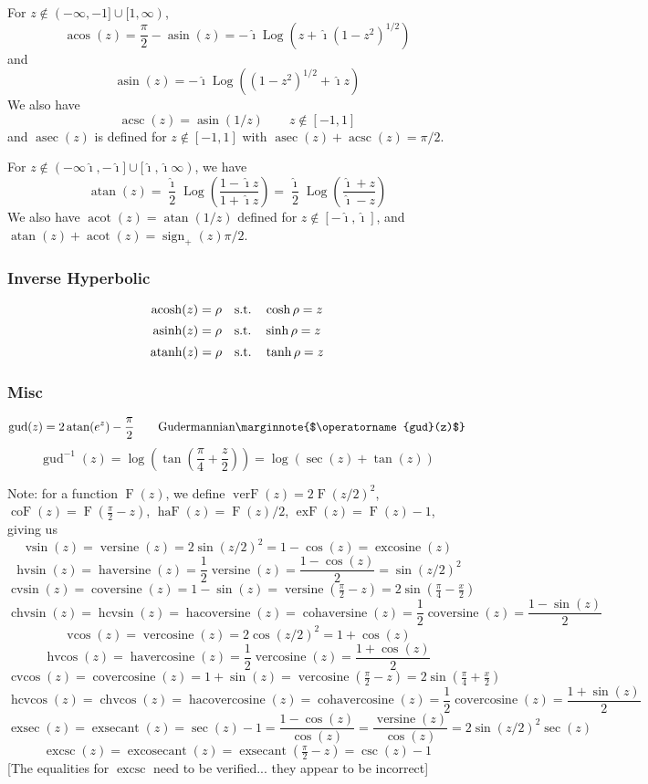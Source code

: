 \documentclass[10pt,dvipdfmx,letterpaper,twoside]{article}
\DeclareMathOperator{\acos}{acos}
\DeclareMathOperator{\asin}{asin}
\DeclareMathOperator{\atan}{atan}
\DeclareMathOperator{\acosh}{acosh}
\DeclareMathOperator{\asinh}{asinh}
\DeclareMathOperator{\atanh}{atanh}
\let\O=\operatorname
\newcommand{\ii}{{\hat{\imath}}}
\let\DEF=\marginnote
\begin{document}
For $z\notin(-\infty,-1]\cup[1,\infty)$,
\[ \acos(z) = \frac{\pi}{2} - \asin(z) = -\ii \O{Log}(z + \ii(1-z^2)^{1/2}) \]
and
\[ \asin(z) = -\ii \O{Log}((1-z^2)^{1/2} + \ii z) \]
We also have
\[ \O{acsc}(z)=\asin(1/z) \qquad z\notin[-1,1] \]
and $\O{asec}(z)$ is defined for $z\notin[-1,1]$ with $\O{asec}(z)+\O{acsc}(z)=\pi/2$.

For $z\notin(-\infty\ii,-\ii]\cup[\ii,\ii\infty)$, we have
\[ \atan(z) = \frac{\ii}{2}\O{Log}(\frac{1-\ii z}{1+\ii z}) = \frac{\ii}{2}\O{Log}(\frac{\ii+z}{\ii-z}) \]
We also have $\O{acot}(z) = \atan(1/z)$ defined for $z\notin[-\ii,\ii]$, and $\atan(z)+\O{acot}(z)=\O{sign}_+(z)\pi/2$.

\subsubsection{Inverse Hyperbolic}
\[ \acosh(z) = \rho \text{\quad s.t.\quad} \cosh\rho = z \]
\[ \asinh(z) = \rho \text{\quad s.t.\quad} \sinh\rho = z \]
\[ \atanh(z) = \rho \text{\quad s.t.\quad} \tanh\rho = z \]

\subsubsection{Misc}
\[ \O{gud}(z) = 2\atan(e^{z}) - \frac\pi2 \qquad\text{Gudermannian} \DEF{$\O{gud}(z)$}\]
\[ \O{gud}^{-1}(z) = \log(\tan(\frac{\pi}{4}+\frac{z}{2})) = \log(\sec(z) + \tan(z)) \]

Note: for a function $\O{F}(z)$, we define
$\O{verF}(z) = 2 \O{F}(z/2)^2$, 
$\O{coF}(z) = \O{F}(\tfrac{\pi}{2} - z)$, 
$\O{haF}(z) = \O{F}(z)/2$, 
$\O{exF}(z) = \O{F}(z) - 1$, giving us
\[ \O{vsin}(z) = \O{versine}(z) =  2\sin(z/2)^2 = 1 - \cos(z) = \O{excosine}(z) \]
\[ \O{hvsin}(z) = \O{haversine}(z) = \frac12\O{versine}(z) = \frac{1-\cos(z)}{2} = \sin(z/2)^2 \]
\[ \O{cvsin}(z) = \O{coversine}(z) = 1 - \sin(z) = \O{versine}(\tfrac\pi2 - z) = 2\sin(\tfrac\pi4 - \tfrac{x}{2}) \]
\[ \O{chvsin}(z) = \O{hcvsin}(z) = \O{hacoversine}(z) = \O{cohaversine}(z) = \frac12\O{coversine}(z) = \frac{1-\sin(z)}{2} \]
\[ \O{vcos}(z) = \O{vercosine}(z) =  2\cos(z/2)^2 = 1 + \cos(z) \]
\[ \O{hvcos}(z) = \O{havercosine}(z) = \frac12\O{vercosine}(z) = \frac{1+\cos(z)}{2} \]
\[ \O{cvcos}(z) = \O{covercosine}(z) = 1 + \sin(z) = \O{vercosine}(\tfrac\pi2 - z) = 2\sin(\tfrac\pi4 + \tfrac{x}{2}) \]
\[ \O{hcvcos}(z) = \O{chvcos}(z) = \O{hacovercosine}(z) = \O{cohavercosine}(z) = \frac12\O{covercosine}(z) = \frac{1+\sin(z)}{2} \]
\[ \O{exsec}(z) = \O{exsecant}(z) = \sec(z) - 1 = \frac{1-\cos(z)}{\cos(z)} = \frac{\O{versine}(z)}{\cos(z)} = 2\sin(z/2)^2\sec(z) \]
\[ \O{excsc}(z) = \O{excosecant}(z) = \O{exsecant}(\tfrac\pi2 - z) = \csc(z) - 1\]
[The equalities for $\O{excsc}$ need to be verified... they appear to be incorrect]
\end{document}
